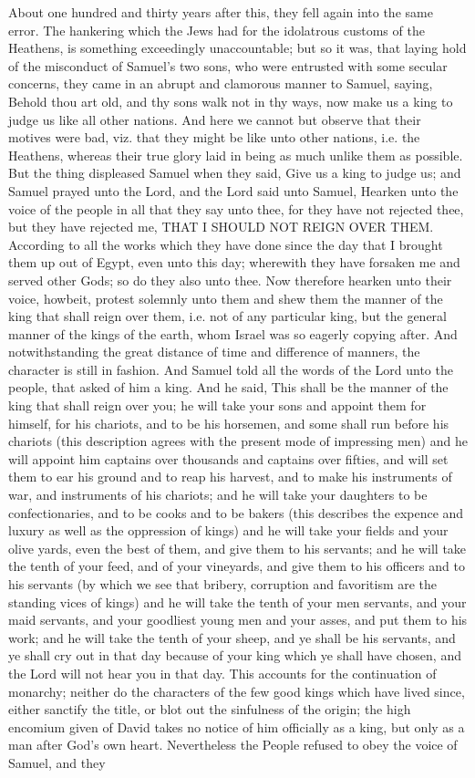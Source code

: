 \documentclass[12pt,oneside]{memoir}
\begin{document}
About one hundred and thirty years after this, they fell again into the same error. The hankering which the Jews had for the idolatrous customs of the Heathens, is something exceedingly unaccountable; but so it was, that laying hold of the misconduct of Samuel's two sons, who were entrusted with some secular concerns, they came in an abrupt and clamorous manner to Samuel, saying, Behold thou art old, and thy sons walk not in thy ways, now make us a king to judge us like all other nations. And here we cannot but observe that their motives were bad, viz. that they might be like unto other nations, i.e. the Heathens, whereas their true glory laid in being as much unlike them as possible. But the thing displeased Samuel when they said, Give us a king to judge us; and Samuel prayed unto the Lord, and the Lord said unto Samuel, Hearken unto the voice of the people in all that they say unto thee, for they have not rejected thee, but they have rejected me, THAT I SHOULD NOT REIGN OVER THEM. According to all the works which they have done since the day that I brought them up out of Egypt, even unto this day; wherewith they have forsaken me and served other Gods; so do they also unto thee. Now therefore hearken unto their voice, howbeit, protest solemnly unto them and shew them the manner of the king that shall reign over them, i.e. not of any particular king, but the general manner of the kings of the earth, whom Israel was so eagerly copying after. And notwithstanding the great distance of time and difference of manners, the character is still in fashion. And Samuel told all the words of the Lord unto the people, that asked of him a king. And he said, This shall be the manner of the king that shall reign over you; he will take your sons and appoint them for himself, for his chariots, and to be his horsemen, and some shall run before his chariots (this description agrees with the present mode of impressing men) and he will appoint him captains over thousands and captains over fifties, and will set them to ear his ground and to reap his harvest, and to make his instruments of war, and instruments of his chariots; and he will take your daughters to be confectionaries, and to be cooks and to be bakers (this describes the expence and luxury as well as the oppression of kings) and he will take your fields and your olive yards, even the best of them, and give them to his servants; and he will take the tenth of your feed, and of your vineyards, and give them to his officers and to his servants (by which we see that bribery, corruption and favoritism are the standing vices of kings) and he will take the tenth of your men servants, and your maid servants, and your goodliest young men and your asses, and put them to his work; and he will take the tenth of your sheep, and ye shall be his servants, and ye shall cry out in that day because of your king which ye shall have chosen, and the Lord will not hear you in that day. This accounts for the continuation of monarchy; neither do the characters of the few good kings which have lived since, either sanctify the title, or blot out the sinfulness of the origin; the high encomium given of David takes no notice of him officially as a king, but only as a man after God's own heart. Nevertheless the People refused to obey the voice of Samuel, and they 
\end{document}
